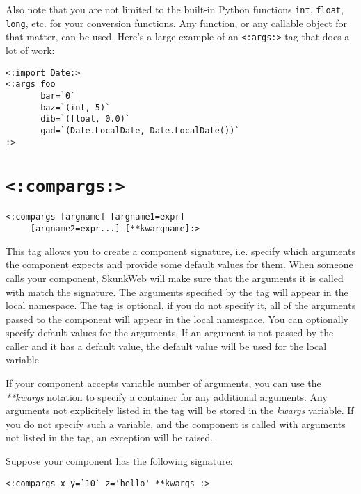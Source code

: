 \documentclass{manual}
\begin{document}
Also note that you are not limited to the built-in Python functions
\texttt{int}, \texttt{float}, \texttt{long}, etc. for your conversion
functions. Any function, or any callable object for that matter, can
be used. Here's a large example of an \texttt{<:args:>} tag
that does a lot of work:

\begin{verbatim}
<:import Date:>
<:args foo
       bar=`0`
       baz=`(int, 5)`
       dib=`(float, 0.0)`
       gad=`(Date.LocalDate, Date.LocalDate())`
:>
\end{verbatim}



\section{\texttt{<:compargs:>}}
\label{tagcompargs}

\begin{verbatim}
<:compargs [argname] [argname1=expr] 
     [argname2=expr...] [**kwargname]:>
\end{verbatim}



This tag allows you to create a component signature, i.e. 
specify which arguments the component expects and provide some
default values for them. When someone calls your component, SkunkWeb
will make sure that the arguments it is called with match the 
signature. The arguments specified by the  
tag will appear in the local namespace. The tag is optional, if you do 
not specify it, all of the arguments passed to the component will
appear in the local namespace. You can optionally specify default 
values for the arguments. If an argument is not passed by the 
caller and it has a default value, the default value will be used for the
local variable

If your component accepts variable number of arguments, you can
use the \emph{**kwargs} notation to specify a container for any 
additional arguments. Any arguments not explicitely listed in the 
 tag will be stored in the 
\emph{kwargs} variable. 
If you do not specify such a variable, and the component is called
with arguments not listed in the  tag, 
an exception will be raised.

Suppose your component has the following signature:

\begin{verbatim}
<:compargs x y=`10` z='hello' **kwargs :>
\end{verbatim}
\end{document}
